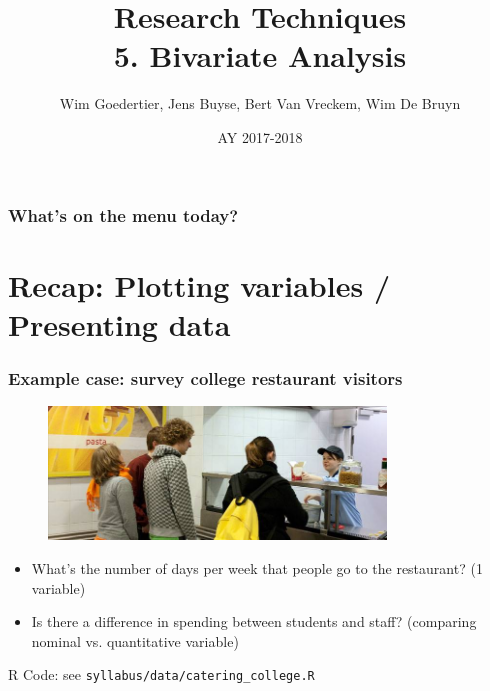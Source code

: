 \documentclass{beamer}
\title[Bivariate Analysis]{Research Techniques\\5. Bivariate Analysis}
\author{Wim Goedertier, Jens Buyse, Bert {Van Vreckem}, Wim {De Bruyn}}
\date{AY 2017-2018}
\begin{document}

\HoGentLogo

\titleframe


\begin{frame}
  \frametitle{What's on the menu today?}

  \tableofcontents
\end{frame}

\section{Recap: Plotting variables / Presenting data}
\sectionframelogo{}

\begin{frame}
  \frametitle{Example case: survey college restaurant visitors}

  \begin{figure}
    \centering
    \includegraphics[width=0.8\textwidth] {img/students.jpg}
    \label{fig:students}
  \end{figure}

  \begin{itemize}
    \item What's the number of days per week that people go to the restaurant? (1 variable)
    \item Is there a difference in spending between students and staff? (comparing nominal vs. quantitative variable)
  \end{itemize}

  R Code: see \texttt{syllabus/data/catering\_college.R}

\end{frame}
\end{document}
